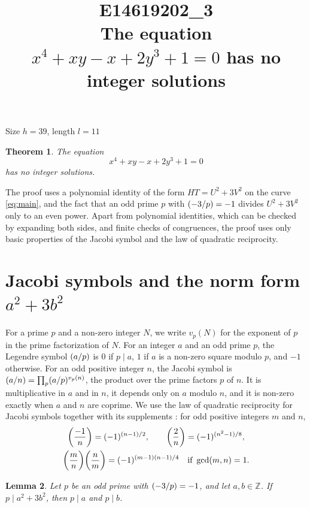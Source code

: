 \documentclass[11pt]{article}
\title{\textbf{E14619202\_3}\\[4pt] {\Large The equation $x^{4}+xy-x+2y^{3}+1=0$ has no integer solutions}}
\author{}
\date{}
\newtheorem{theorem}{Theorem}
\newtheorem{lemma}[theorem]{Lemma}
\newcommand{\Z}{\mathbb{Z}}
\newcommand{\leg}[2]{\mathchoice{\biggl(\dfrac{#1}{#2}\biggr)}{(#1/#2)}{(#1/#2)}{(#1/#2)}}
\begin{document}
\maketitle
\vspace{-8ex}
\begin{center}
Size $h=39$, length $l=11$
\end{center}

\begin{theorem}\label{thm:main}
The equation
\begin{equation}\label{eq:main}
x^{4}+xy-x+2y^{3}+1=0
\end{equation}
has no integer solutions.
\end{theorem}

The proof uses a polynomial identity of the form $HT=U^2+3V^2$ on the curve \eqref{eq:main}, and the fact that an odd prime $p$ with $\leg{-3}{p}=-1$ divides $U^2+3V^2$ only to an even power. Apart from polynomial identities, which can be checked by expanding both sides, and finite checks of congruences, the proof uses only basic properties of the Jacobi symbol and the law of quadratic reciprocity.

\section{\texorpdfstring{Jacobi symbols and the norm form $a^2+3b^2$}{Jacobi symbols and the norm form}}

For a prime $p$ and a non-zero integer $N$, we write $v_p(N)$ for the exponent of $p$ in the prime factorization of $N$. For an integer $a$ and an odd prime $p$, the Legendre symbol $\leg{a}{p}$ is $0$ if $p\mid a$, $1$ if $a$ is a non-zero square modulo $p$, and $-1$ otherwise. For an odd positive integer $n$, the Jacobi symbol is $\leg{a}{n}=\prod_p\leg{a}{p}^{v_p(n)}$, the product over the prime factors $p$ of $n$. It is multiplicative in $a$ and in $n$, it depends only on $a$ modulo $n$, and it is non-zero exactly when $a$ and $n$ are coprime. We use the law of quadratic reciprocity for Jacobi symbols together with its supplements \cite[Chapter~5, \S2]{IR}: for odd positive integers $m$ and $n$,
\begin{gather*}
\leg{-1}{n}=(-1)^{(n-1)/2},\qquad\leg{2}{n}=(-1)^{(n^2-1)/8},\\
\leg{m}{n}\leg{n}{m}=(-1)^{(m-1)(n-1)/4}\quad\text{if }\gcd(m,n)=1.
\end{gather*}

\begin{lemma}\label{lem:divides}
Let $p$ be an odd prime with $\leg{-3}{p}=-1$, and let $a,b\in\Z$. If $p\mid a^2+3b^2$, then $p\mid a$ and $p\mid b$.
\end{lemma}
\end{document}

